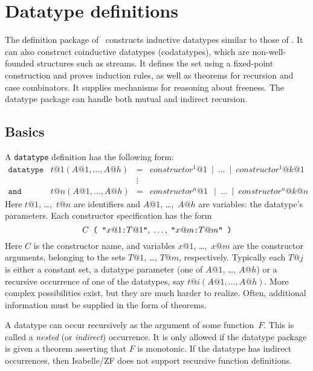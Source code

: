 \section{Datatype definitions}
\label{sec:ZF:datatype}

The  definition package of \ZF\ constructs inductive
datatypes similar to those of \ML.  It can also construct coinductive
datatypes (codatatypes), which are non-well-founded structures such as
streams.  It defines the set using a fixed-point construction and proves
induction rules, as well as theorems for recursion and case combinators.  It
supplies mechanisms for reasoning about freeness.  The datatype package can
handle both mutual and indirect recursion.


\subsection{Basics}
\label{subsec:datatype:basics}

A \texttt{datatype} definition has the following form:
\[
\begin{array}{llcl}
\mathtt{datatype} & t@1(A@1,\ldots,A@h) & = &
  constructor^1@1 ~\mid~ \ldots ~\mid~ constructor^1@{k@1} \\
 & & \vdots \\
\mathtt{and} & t@n(A@1,\ldots,A@h) & = &
  constructor^n@1~ ~\mid~ \ldots ~\mid~ constructor^n@{k@n}
\end{array}
\]
Here $t@1$, \ldots,~$t@n$ are identifiers and $A@1$, \ldots,~$A@h$ are
variables: the datatype's parameters.  Each constructor specification has the
form \dquotesoff
\[ C \hbox{\tt~( } \hbox{\tt"} x@1 \hbox{\tt:} T@1 \hbox{\tt"},\;
                   \ldots,\;
                   \hbox{\tt"} x@m \hbox{\tt:} T@m \hbox{\tt"}
     \hbox{\tt~)}
\]
Here $C$ is the constructor name, and variables $x@1$, \ldots,~$x@m$ are the
constructor arguments, belonging to the sets $T@1$, \ldots, $T@m$,
respectively.  Typically each $T@j$ is either a constant set, a datatype
parameter (one of $A@1$, \ldots, $A@h$) or a recursive occurrence of one of
the datatypes, say $t@i(A@1,\ldots,A@h)$.  More complex possibilities exist,
but they are much harder to realize.  Often, additional information must be
supplied in the form of theorems.

A datatype can occur recursively as the argument of some function~$F$.  This
is called a {\em nested} (or \emph{indirect}) occurrence.  It is only allowed
if the datatype package is given a theorem asserting that $F$ is monotonic.
If the datatype has indirect occurrences, then Isabelle/ZF does not support
recursive function definitions.

